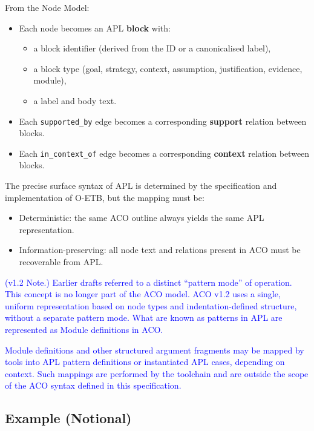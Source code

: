 \documentclass[11pt]{article}
\begin{document}
From the Node Model:
\begin{itemize}[leftmargin=2em]
  \item Each node becomes an APL \textbf{block} with:
  \begin{itemize}[leftmargin=1.5em]
    \item a block identifier (derived from the ID or a canonicalised label),
    \item a block type (goal, strategy, context, assumption, justification, evidence, module),
    \item a label and body text.
  \end{itemize}

  \item Each \texttt{supported\_by} edge becomes a corresponding \textbf{support} relation between blocks.

  \item Each \texttt{in\_context\_of} edge becomes a corresponding \textbf{context} relation between blocks.
\end{itemize}

The precise surface syntax of APL is determined by the specification and implementation of O-ETB, but the mapping must be:
\begin{itemize}[leftmargin=2em]
  \item Deterministic: the same ACO outline always yields the same APL representation.
  \item Information-preserving: all node text and relations present in ACO must be recoverable from APL.
\end{itemize}

\textcolor{blue}{(v1.2 Note.)
Earlier drafts referred to a distinct ``pattern mode'' of operation. This concept is
no longer part of the ACO model. ACO v1.2 uses a single, uniform representation based
on node types and indentation-defined structure, without a separate pattern mode. What are known as patterns in APL are represented as Module definitions in ACO.}

\textcolor{blue}{Module definitions and other structured argument fragments
may be mapped by tools into APL pattern definitions or instantiated APL cases, depending
on context. Such mappings are performed by the toolchain and are outside the scope of
the ACO syntax defined in this specification.}

\subsection{Example (Notional)}
\end{document}
